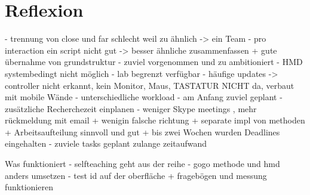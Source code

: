 \section{Reflexion} \label{sec:Reflexion}

- trennung von close und far schlecht weil zu ähnlich -> ein Team
- pro interaction ein script nicht gut -> besser ähnliche zusammenfassen
+ gute übernahme von grundstruktur
- zuviel vorgenommen und zu ambitioniert
- HMD systembedingt nicht möglich
- lab begrenzt verfügbar
- häufige updates -> controller nicht erkannt, kein Monitor, Maus, TASTATUR NICHT da, verbaut mit mobile Wände
- unterschiedliche workload
- am Anfang zuviel geplant
- zusätzliche Recherchezeit einplanen
- weniger Skype meetings , mehr rückmeldung mit email
+ wenigin falsche richtung
+ separate impl von methoden
+ Arbeitsaufteilung sinnvoll und gut
+ bis zwei Wochen wurden Deadlines eingehalten
- zuviele tasks geplant zulange zeitaufwand


 
 Was funktioniert
 - selfteaching geht aus der reihe
 - gogo methode und hmd anders umsetzen
 - test id auf der oberfläche
 + fragebögen und messung funktionieren 
 
 
\newpage

























